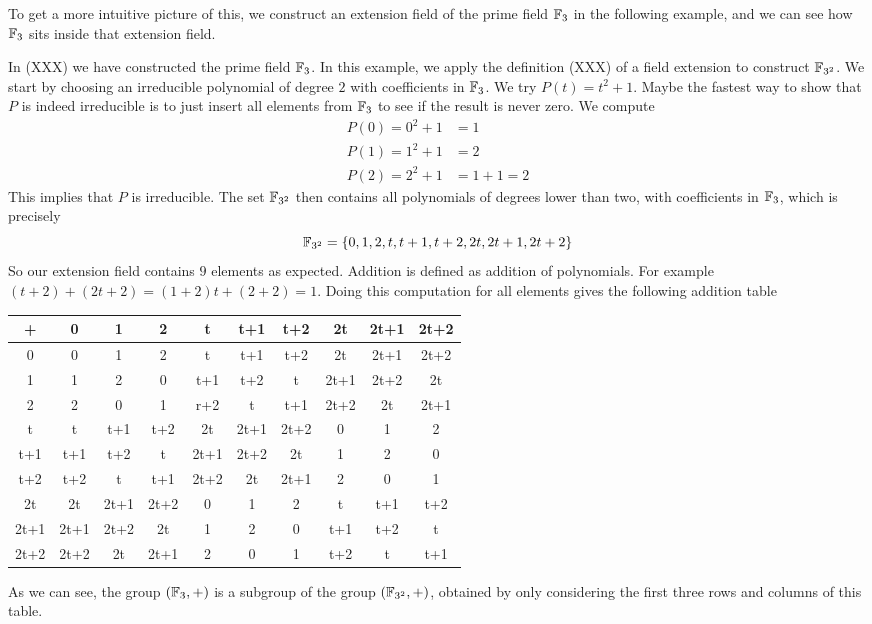 To get a more intuitive picture of this, we construct an extension field of the prime field  $\mathbb{F}_3$ in the following example, and we can see how $\mathbb{F}_3$ sits inside that extension field. 
\begin{example}In (XXX) we have constructed the prime field $\mathbb{F}_3$. In this example, we apply the definition (XXX) of a field extension to construct $\mathbb{F}_{3^2}$. We start by choosing an irreducible polynomial of degree $2$ with coefficients in $\mathbb{F}_3$. We try
$P(t)=t^2+1$. Maybe the fastest way to show that $P$ is indeed irreducible is to just insert all elements from $\mathbb{F}_3$ to see if the result is never zero. We compute
\begin{align*}
P(0) = 0^2+1 &= 1\\
P(1) = 1^2+1 &= 2\\
P(2) = 2^2+1 &=  1+1  = 2
\end{align*}
This implies that $P$ is irreducible. The set $\mathbb{F}_{3^2}$ then contains all polynomials of degrees lower than two, with coefficients in $\mathbb{F}_3$, which is precisely
$$
\mathbb{F}_{3^2}=\{0,1,2,t,t+1,t+2,2t,2t+1,2t+2\}
$$
So our extension field contains $9$ elements as expected. Addition is  defined as addition of polynomials. For example $(t+2) + (2t+2)= (1+2)t +(2+2)= 1$. Doing this computation for all elements gives the following addition table
\begin{center}
  \begin{tabular}{c | c c c c c c c c c}
    + & 0    & 1    & 2    & t    & t+1  & t+2  & 2t   & 2t+1 & 2t+2 \\\hline
    0 & 0    & 1    & 2    & t    & t+1  & t+2  & 2t   & 2t+1 & 2t+2 \\
    1 & 1    & 2    & 0    & t+1  & t+2  & t    & 2t+1 & 2t+2 & 2t   \\
    2 & 2    & 0    & 1    & r+2  & t    & t+1  & 2t+2 & 2t   & 2t+1 \\
    t & t    & t+1  & t+2  & 2t   & 2t+1 & 2t+2 & 0    & 1    & 2    \\
  t+1 & t+1  & t+2  & t    & 2t+1 & 2t+2 & 2t   & 1    & 2    & 0    \\
  t+2 & t+2  & t    & t+1  & 2t+2 & 2t   & 2t+1 & 2    & 0    & 1    \\
   2t & 2t   & 2t+1 & 2t+2 & 0    & 1    & 2    & t    & t+1  & t+2  \\
 2t+1 & 2t+1 & 2t+2 & 2t   & 1    & 2    & 0    & t+1  & t+2  & t    \\
 2t+2 & 2t+2 & 2t   & 2t+1 & 2    & 0    & 1    & t+2  & t    & t+1
  \end{tabular}
\end{center}
As we can see, the group $(\mathbb{F}_3,+)$ is a subgroup of the group $(\mathbb{F}_{3^2},+)$, obtained by only considering the first three rows and columns of this table.


\end{example}
